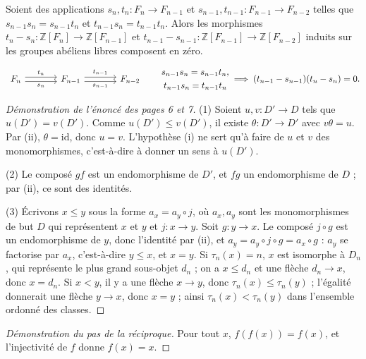 \begin{enonce}
Soient des applications $s_n, t_n : F_n \to F_{n-1}$ et $s_{n-1}, t_{n-1} : F_{n-1} \to F_{n-2}$ telles que $s_{n-1}s_n = s_{n-1}t_n$ et $t_{n-1}s_n = t_{n-1}t_n$. Alors les morphismes $t_n - s_n : \mathbb Z[F_n] \to \mathbb Z[F_{n-1}]$ et $t_{n-1} - s_{n-1} : \mathbb Z[F_{n-1}] \to \mathbb Z[F_{n-2}]$ induits sur les groupes abéliens libres composent en zéro.
\end{enonce}

\[
\begin{tikzcd}[column sep=large]
F_n \arrow[r, shift left, "t_n"] \arrow[r, shift right, "s_n"'] & F_{n-1} \arrow[r, shift left, "t_{n-1}"] \arrow[r, shift right, "s_{n-1}"'] & F_{n-2}
\end{tikzcd}
\qquad
\begin{gathered}
s_{n-1}s_n = s_{n-1}t_n,\\ t_{n-1}s_n = t_{n-1}t_n
\end{gathered}
\;\Longrightarrow\;
(t_{n-1} - s_{n-1})(t_n - s_n) = 0.
\]

\begin{proof}[Démonstration de l'énoncé des pages 6 et 7]
(1) Soient $u, v : D' \to D$ tels que $u(D') = v(D')$. Comme $u(D') \leq v(D')$, il existe $\theta : D' \to D'$ avec $v\theta = u$. Par (ii), $\theta = \mathrm{id}$, donc $u = v$. L'hypothèse (i) ne sert qu'à faire de $u$ et $v$ des monomorphismes, c'est-à-dire à donner un sens à $u(D')$.

(2) Le composé $gf$ est un endomorphisme de $D'$, et $fg$ un endomorphisme de $D$ ; par (ii), ce sont des identités.

(3) Écrivons $x \leq y$ sous la forme $a_x = a_y \circ j$, où $a_x, a_y$ sont les monomorphismes de but $D$ qui représentent $x$ et $y$ et $j : x \to y$. Soit $g : y \to x$. Le composé $j \circ g$ est un endomorphisme de $y$, donc l'identité par (ii), et $a_y = a_y \circ j \circ g = a_x \circ g$ : $a_y$ se factorise par $a_x$, c'est-à-dire $y \leq x$, et $x = y$. Si $\tau_n(x) = n$, $x$ est isomorphe à $D_n$, qui représente le plus grand sous-objet $d_n$ ; on a $x \leq d_n$ et une flèche $d_n \to x$, donc $x = d_n$. Si $x < y$, il y a une flèche $x \to y$, donc $\tau_n(x) \leq \tau_n(y)$ ; l'égalité donnerait une flèche $y \to x$, donc $x = y$ ; ainsi $\tau_n(x) < \tau_n(y)$ dans l'ensemble ordonné des classes.
\end{proof}

\begin{proof}[Démonstration du pas de la réciproque]
Pour tout $x$, $f(f(x)) = f(x)$, et l'injectivité de $f$ donne $f(x) = x$.
\end{proof}

